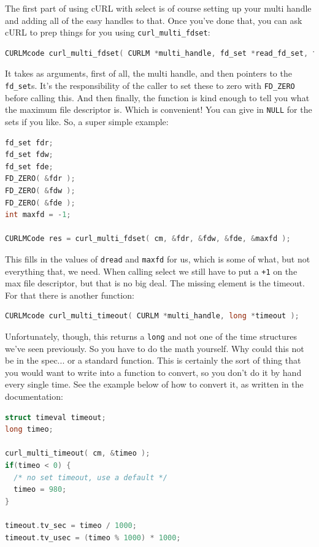\documentclass[a4paper]{report}
\begin{document}
The first part of using cURL with select is of course setting up your multi handle and adding all of the easy handles to that. Once you've done that, you can ask cURL to prep things for you using \texttt{curl\_multi\_fdset}:

\begin{lstlisting}[language=C]
CURLMcode curl_multi_fdset( CURLM *multi_handle, fd_set *read_fd_set, fd_set *write_fd_set, fd_set *exc_fd_set, int *max_fd );
\end{lstlisting}

It takes as arguments, first of all, the multi handle, and then pointers to the \texttt{fd\_set}s. It's the responsibility of the caller to set these to zero with \texttt{FD\_ZERO} before calling this. And then finally, the function is kind enough to tell you what the maximum file descriptor is. Which is convenient! You can give in \texttt{NULL} for the sets if you like. So, a super simple example:

\begin{lstlisting}[language=C]
fd_set fdr;
fd_set fdw;
fd_set fde;
FD_ZERO( &fdr );
FD_ZERO( &fdw );
FD_ZERO( &fde );
int maxfd = -1;

CURLMCode res = curl_multi_fdset( cm, &fdr, &fdw, &fde, &maxfd );
\end{lstlisting}

This fills in the values of \texttt{dread} and \texttt{maxfd} for us, which is some of what, but not everything that, we need. When calling select we still have to put a \texttt{+1} on the max file descriptor, but that is no big deal. The missing element is the timeout. For that there is another function:

\begin{lstlisting}[language=C]
CURLMcode curl_multi_timeout( CURLM *multi_handle, long *timeout );
\end{lstlisting}

Unfortunately, though, this returns a \texttt{long} and not one of the time structures we've seen previously. So you have to do the math yourself. Why could this not be in the spec... or a standard function. This is certainly the sort of thing that you would want to write into a function to convert, so you don't do it by hand every single time. See the example below of how to convert it, as written in the documentation:

\begin{lstlisting}[language=C]
struct timeval timeout;
long timeo;
 
curl_multi_timeout( cm, &timeo );
if(timeo < 0) {
  /* no set timeout, use a default */
  timeo = 980;
}
 
timeout.tv_sec = timeo / 1000;
timeout.tv_usec = (timeo % 1000) * 1000;
\end{lstlisting}
\end{document}
